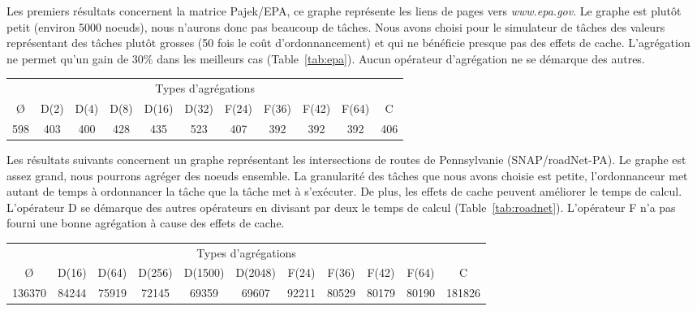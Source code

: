 Les premiers résultats concernent la matrice Pajek/EPA, ce graphe représente les liens de pages vers {\em www.epa.gov}.
%
Le graphe est plutôt petit (environ 5000 noeuds), nous n'aurons donc pas beaucoup de tâches.
%
Nous avons choisi pour le simulateur de tâches des valeurs représentant des tâches plutôt grosses (50 fois le coût d'ordonnancement) et qui ne bénéficie presque pas des effets de cache.
%
L'agrégation ne permet qu'un gain de 30\% dans les meilleurs cas (Table~\ref{tab:epa}).
%
Aucun opérateur d'agrégation ne se démarque des autres.

\begin{center}
  \begin{tabular}{|c|c|c|c|c|c|c|c|c|c|c|}
    \hline
    \multicolumn{11}{|c|}{Types d'agrégations}\\
    \O & D(2) & D(4) & D(8) & D(16) & D(32) & F(24) & F(36) & F(42) & F(64) & C \\
    \hline
    598 & 403 & 400 & 428 & 435 & 523 & 407 & 392 & 392 & 392 & 406 \\
    \hline
  \end{tabular}
  \label{tab:epa}
\end{center}


Les résultats suivants concernent un graphe représentant les intersections de routes de Pennsylvanie (SNAP/roadNet-PA).
%
Le graphe est assez grand, nous pourrons agréger des noeuds ensemble.
%
La granularité des tâches que nous avons choisie est petite, l'ordonnanceur met autant de temps à ordonnancer la tâche que la tâche met à s'exécuter.
%
De plus, les effets de cache peuvent améliorer le temps de calcul.
%
L'opérateur D se démarque des autres opérateurs en divisant par deux le temps de calcul (Table~\ref{tab:roadnet}).
%
L'opérateur F n'a pas fourni une bonne agrégation à cause des effets de cache.


\begin{center}
  \begin{tabular}{|c|c|c|c|c|c|c|c|c|c|c|}
    \hline
    \multicolumn{11}{|c|}{Types d'agrégations}\\
    \O & D(16) & D(64) & D(256) & D(1500) & D(2048) & F(24) & F(36) & F(42) & F(64) & C \\
    \hline
    136370 & 84244 & 75919 & 72145 & 69359 & 69607 & 92211 & 80529 & 80179 & 80190 & 181826 \\
    \hline
  \end{tabular}
  \label{tab:roadnet}
\end{center}



